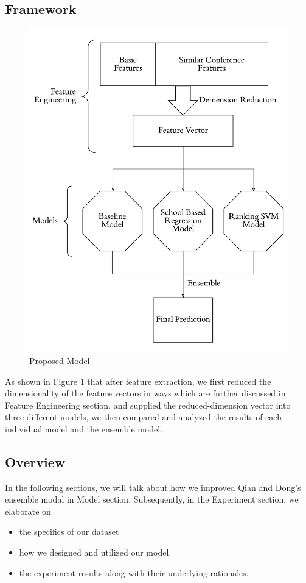 \documentclass[letterpaper]{article}
\begin{document}
\subsection{Framework}
\begin{figure}[h]
    \centering
    \includegraphics[width=\linewidth]{Framework.png}
    \caption{Proposed Model}
    \label{fig:my_label}
\end{figure}
As shown in Figure 1 that after feature extraction, we first reduced the dimensionality of the feature vectors in ways which are further discussed in Feature Engineering section, and supplied the reduced-dimension vector into three different models, we then compared and analyzed the results of each individual model and the ensemble model. 

\subsection{Overview}
In the following sections, we will talk about how we improved Qian and Dong's ensemble modal in Model section. Subsequently, in the Experiment section, we elaborate on 
\begin{itemize}
    \item the specifics of our dataset
    \item how we designed and utilized our model
    \item the experiment results along with their underlying rationales.
\end{itemize}
\end{document}
